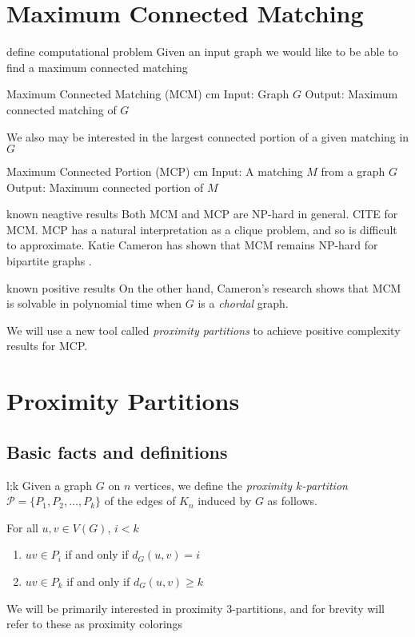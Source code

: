 \documentclass{beamer}
\newcommand{\bframe}[2]{\begin{frame}{#1} #2 \end{frame}}
\begin{document}
\section{Maximum Connected Matching}
\bframe{define computational problem}{Given an input graph we would like to be able to find a maximum connected matching
 \begin{framed}
  Maximum Connected Matching (MCM)
  \vskip 0.25 cm Input: Graph $G$
  \newline Output: Maximum connected matching of $G$
 \end{framed}
We also may be interested in the largest connected portion of a given matching in $G$
 \begin{framed}
  Maximum Connected Portion (MCP)
  \vskip 0.25 cm Input: A matching $M$ from a graph $G$
  \newline Output: Maximum connected portion of $M$
 \end{framed}}
\bframe{known neagtive results}{Both MCM and MCP are NP-hard in general. CITE for MCM. MCP has a natural interpretation as a clique problem, and so is difficult to approximate. Katie Cameron has shown that MCM remains NP-hard for bipartite graphs \cite{MR2163948}.}
\bframe{known positive results}{On the other hand, Cameron's research shows that MCM is solvable in polynomial time when $G$ is a \textit{chordal} graph. 

We will use a new tool called \textit{proximity partitions} to achieve positive complexity results for MCP.}
\section{Proximity Partitions}
\subsection{Basic facts and definitions}
\bframe{l;k}{Given a graph $G$ on $n$ vertices, we define the \textit{proximity $k$-partition} $\mathcal{P} = \{P_1, P_2, \ldots, P_k\}$ of the edges of $K_n$ induced by $G$ as follows.

For all $u,v \in V(G)$, $i < k$
 \begin{enumerate}
  \item $uv \in P_i$ if and only if $d_G(u,v) = i$
  \item $uv \in P_k$ if and only if $d_G(u,v) \geq k$
 \end{enumerate}
\quad }
\bframe{}{We will be primarily interested in proximity 3-partitions, and for brevity will refer to these as proximity colorings}
\end{document}
